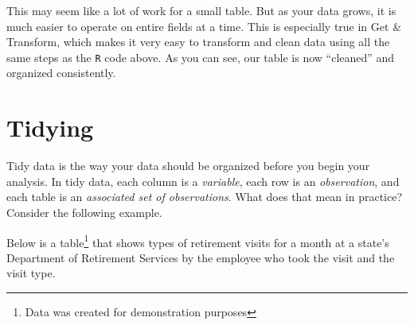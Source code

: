 \documentclass[]{book}
\newenvironment{Shaded}{\begin{snugshade}}{\end{snugshade}}
\newcommand{\CommentTok}[1]{\textcolor[rgb]{0.56,0.35,0.01}{\textit{#1}}}
\newcommand{\DataTypeTok}[1]{\textcolor[rgb]{0.13,0.29,0.53}{#1}}
\newcommand{\KeywordTok}[1]{\textcolor[rgb]{0.13,0.29,0.53}{\textbf{#1}}}
\newcommand{\NormalTok}[1]{#1}
\newcommand{\OperatorTok}[1]{\textcolor[rgb]{0.81,0.36,0.00}{\textbf{#1}}}
\newcommand{\OtherTok}[1]{\textcolor[rgb]{0.56,0.35,0.01}{#1}}
\newcommand{\StringTok}[1]{\textcolor[rgb]{0.31,0.60,0.02}{#1}}
\begin{document}
\begin{Shaded}
\begin{Highlighting}[]
{{{{{\CommentTok{#print to datatable}
\NormalTok{sites_cleaned}\OperatorTok{%
    \DataTypeTok{extensions =} \StringTok{'Buttons'}\NormalTok{, }
    \DataTypeTok{options =} \KeywordTok{list}\NormalTok{(}\DataTypeTok{dom =} \StringTok{'Bfrtip'}\NormalTok{, }
                   \DataTypeTok{buttons =} \StringTok{'excel'}\NormalTok{,}
                   \DataTypeTok{searching =} \OtherTok{FALSE}\NormalTok{))}
\end{Highlighting}
\end{Shaded}

\hypertarget{htmlwidget-1066ec05497750cd03da}{}

This may seem like a lot of work for a small table. But as your data grows, it is much easier to operate on entire fields at a time. This is especially true in Get \& Transform, which makes it very easy to transform and clean data using all the same steps as the \texttt{R} code above. As you can see, our table is now ``cleaned'' and organized consistently.

\hypertarget{tidying}{%
\section{Tidying}\label{tidying}}

Tidy data is the way your data should be organized before you begin your analysis. In tidy data, each column is a \emph{variable}, each row is an \emph{observation}, and each table is an \emph{associated set of observations}. What does that mean in practice? Consider the following example.

Below is a table\footnote{Data was created for demonstration purposes} that shows types of retirement visits for a month at a state's Department of Retirement Services by the employee who took the visit and the visit type.
\end{document}
